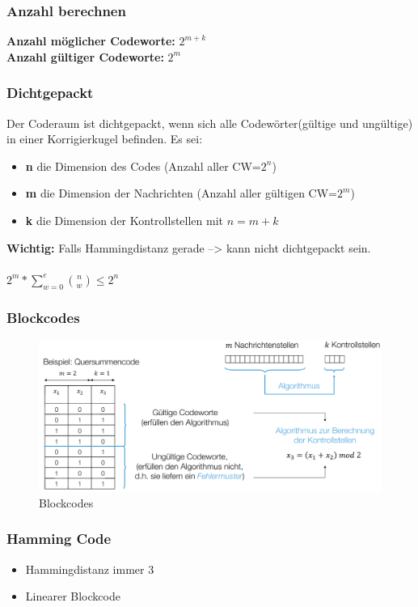 \subsubsection{Anzahl berechnen}
\textbf{Anzahl möglicher Codeworte:} $2^{m+k}$
\\
\textbf{Anzahl gültiger Codeworte:} $2^m$
\\


\subsubsection{Dichtgepackt}
Der Coderaum ist dichtgepackt, wenn sich alle Codewörter(gültige und ungültige) in einer Korrigierkugel befinden. Es sei:
\begin{itemize}
	\item \textbf{n} die Dimension des Codes (Anzahl aller CW=$2^n$)
	\item \textbf{m} die Dimension der Nachrichten (Anzahl aller gültigen CW=$2^m$)
	\item \textbf{k} die Dimension der Kontrollstellen mit $n=m+k$
\end{itemize} 

\textbf{Wichtig:} Falls Hammingdistanz gerade --> kann nicht dichtgepackt sein. \\
\\
$2^m*\sum_{w=0}^e\binom{n}{w}\leqslant2^n$

\subsubsection{Blockcodes}
\begin{figure}[h!]
	\centering
	\begin{minipage}[t]{0.6\textwidth}
		\centering
		\includegraphics[width=0.9\linewidth]{images/blockcodes}
		\caption{Blockcodes}
		\label{fig:blockcodes}
	\end{minipage}
\end{figure}

\subsubsection{Hamming Code}
\begin{itemize}
	\item Hammingdistanz immer 3
	\item Linearer Blockcode
\end{itemize}

